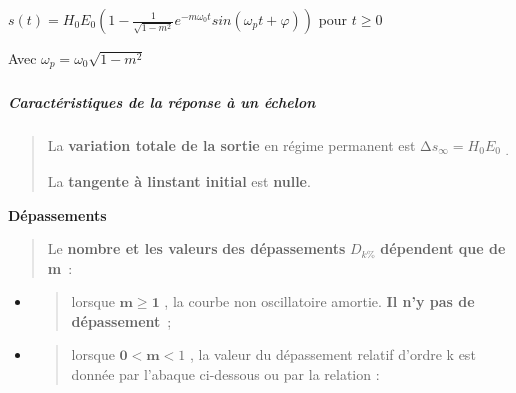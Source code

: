 \(s(t) = H_{0}E_{0}\left( 1 - \frac{1}{\sqrt{1 - m^{2}}}e^{- m\omega_{0}t}sin\left( \omega_{p}t + \varphi \right) \right)\) pour \(t \geq 0\)

Avec \(\omega_{p} = \omega_{0}\sqrt{1 - m^{2}}\)

\hypertarget{mod-section-4}{%
\subparagraph*{}\label{mod-section-4}}

\hypertarget{mod-section-5}{%
\subparagraph*{}\label{mod-section-5}}

\hypertarget{mod-section-6}{%
\subparagraph*{}\label{mod-section-6}}

\hypertarget{mod-section-7}{%
\subparagraph*{}\label{mod-section-7}}

\hypertarget{mod-section-8}{%
\subparagraph*{}\label{mod-section-8}}

\hypertarget{mod-section-9}{%
\subparagraph*{}\label{mod-section-9}}

\hypertarget{mod-section-10}{%
\subparagraph*{}\label{mod-section-10}}

\hypertarget{mod-section-11}{%
\subparagraph*{}\label{mod-section-11}}

\hypertarget{mod-caractuxe9ristiques-de-la-ruxe9ponse-uxe0-un-uxe9chelon}{%
\subparagraph*{Caractéristiques de la réponse à un échelon}\label{mod-caractuxe9ristiques-de-la-ruxe9ponse-uxe0-un-uxe9chelon}}

\begin{quote}
La \textbf{variation totale de la sortie} en régime permanent est \({\mathrm{\Delta}s}_{\infty} = H_{0}E_{0}\) \textsubscript{.}

La \textbf{tangente à l\textquotesingle instant initial} est \textbf{nulle}.
\end{quote}

\textbf{Dépassements}

\begin{quote}
Le \textbf{nombre et les valeurs} \textbf{des dépassements} \(D_{k\%}\) \textbf{dépendent que de m}~:
\end{quote}

\begin{itemize}
\item
  \begin{quote}
  lorsque \(\mathbf{m \geq 1}\) , la courbe non oscillatoire amortie. \textbf{Il n'y pas de dépassement}~;
  \end{quote}
\item
  \begin{quote}
  lorsque \(\mathbf{0} < \mathbf{m}\mathbf{<}1\) , la valeur du dépassement relatif d'ordre k est donnée par l'abaque ci-dessous ou par la relation :
  \end{quote}
\end{itemize}

